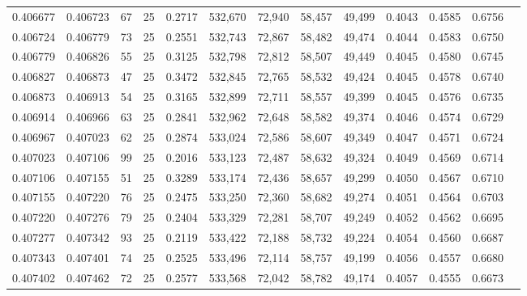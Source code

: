 \begin{tabular}{rrrrrrrrrrrrr}
0.406677 & 0.406723 &    67 &  25 &                                     0.2717 & 532,670 &  72,940 &  58,457 &  49,499 & 0.4043 & 0.4585 & 0.6756 \\
0.406724 & 0.406779 &    73 &  25 &                                     0.2551 & 532,743 &  72,867 &  58,482 &  49,474 & 0.4044 & 0.4583 & 0.6750 \\
0.406779 & 0.406826 &    55 &  25 &                                     0.3125 & 532,798 &  72,812 &  58,507 &  49,449 & 0.4045 & 0.4580 & 0.6745 \\
0.406827 & 0.406873 &    47 &  25 &                                     0.3472 & 532,845 &  72,765 &  58,532 &  49,424 & 0.4045 & 0.4578 & 0.6740 \\
0.406873 & 0.406913 &    54 &  25 &                                     0.3165 & 532,899 &  72,711 &  58,557 &  49,399 & 0.4045 & 0.4576 & 0.6735 \\
0.406914 & 0.406966 &    63 &  25 &                                     0.2841 & 532,962 &  72,648 &  58,582 &  49,374 & 0.4046 & 0.4574 & 0.6729 \\
0.406967 & 0.407023 &    62 &  25 &                                     0.2874 & 533,024 &  72,586 &  58,607 &  49,349 & 0.4047 & 0.4571 & 0.6724 \\
0.407023 & 0.407106 &    99 &  25 &                                     0.2016 & 533,123 &  72,487 &  58,632 &  49,324 & 0.4049 & 0.4569 & 0.6714 \\
0.407106 & 0.407155 &    51 &  25 &                                     0.3289 & 533,174 &  72,436 &  58,657 &  49,299 & 0.4050 & 0.4567 & 0.6710 \\
0.407155 & 0.407220 &    76 &  25 &                                     0.2475 & 533,250 &  72,360 &  58,682 &  49,274 & 0.4051 & 0.4564 & 0.6703 \\
0.407220 & 0.407276 &    79 &  25 &                                     0.2404 & 533,329 &  72,281 &  58,707 &  49,249 & 0.4052 & 0.4562 & 0.6695 \\
0.407277 & 0.407342 &    93 &  25 &                                     0.2119 & 533,422 &  72,188 &  58,732 &  49,224 & 0.4054 & 0.4560 & 0.6687 \\
0.407343 & 0.407401 &    74 &  25 &                                     0.2525 & 533,496 &  72,114 &  58,757 &  49,199 & 0.4056 & 0.4557 & 0.6680 \\
0.407402 & 0.407462 &    72 &  25 &                                     0.2577 & 533,568 &  72,042 &  58,782 &  49,174 & 0.4057 & 0.4555 & 0.6673 \\

\end{tabular}
